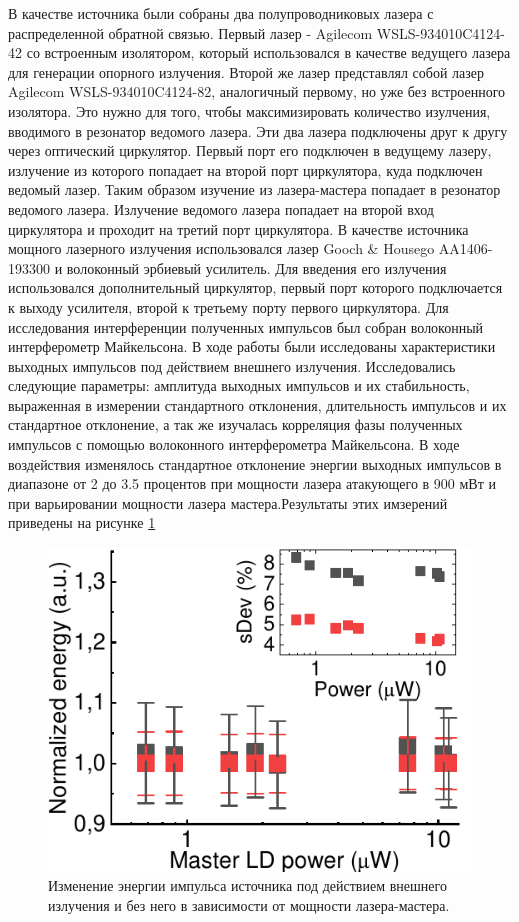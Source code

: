 В качестве источника были собраны два полупроводниковых лазера с распределенной обратной связью. Первый лазер - Agilecom WSLS-934010C4124-42 со встроенным изолятором, который использовался в качестве ведущего лазера для генерации опорного излучения. Второй же лазер представлял собой лазер Agilecom WSLS-934010C4124-82, аналогичный первому, но уже без встроенного изолятора. Это нужно для того, чтобы максимизировать количество изулчения, вводимого в резонатор ведомого лазера. Эти два лазера подключены друг к другу через оптический циркулятор. Первый порт его подключен в ведущему лазеру, излучение из которого попадает на второй порт циркулятора, куда подключен ведомый лазер. Таким образом изучение из лазера-мастера попадает в резонатор ведомого лазера. Излучение ведомого лазера попадает на второй вход циркулятора и проходит на третий порт циркулятора. В качестве источника мощного лазерного излучения использовался лазер Gooch \& Housego AA1406-193300 и волоконный эрбиевый усилитель. Для введения его излучения использовался дополнительный циркулятор, первый порт которого подключается к выходу усилителя, второй к третьему порту первого циркулятора. Для исследования интерференции полученных импульсов был собран волоконный интерферометр Майкельсона. 
\newline В ходе работы были исследованы характеристики выходных импульсов под действием внешнего излучения. Исследовались следующие параметры: амплитуда выходных импульсов и их стабильность, выраженная в измерении стандартного отклонения, длительность импульсов и их стандартное отклонение, а так же изучалась корреляция фазы  полученных импульсов с помощью волоконного интерферометра Майкельсона. В ходе воздействия изменялось стандартное отклонение энергии выходных импульсов в диапазоне от 2 до 3.5 процентов при мощности лазера атакующего в 900 мВт и при варьировании мощности лазера мастера.Результаты этих имзерений приведены на рисунке \ref{fig:area MDI ref}
\begin{figure}
    \centering
    \includegraphics{images/area_under_attack.pdf}
    \caption{Изменение энергии импульса источника под действием внешнего излучения и без него в зависимости от мощности лазера-мастера.}
    \label{fig:area MDI ref}
\end{figure}

